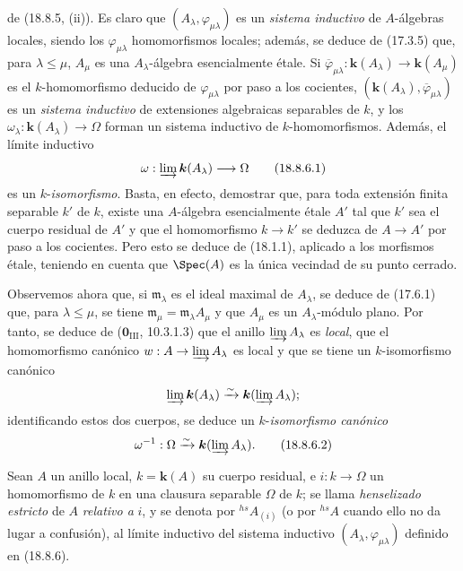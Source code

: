 \begin{env}[18.8.6]
de (18.8.5, (ii)). Es claro que $(A_\lambda,\varphi_{\mu\lambda})$ es un \emph{sistema inductivo} de $A$-álgebras locales, siendo los $\varphi_{\mu\lambda}$ homomorfismos locales; además, se deduce de (17.3.5) que, para $\lambda\leq\mu$, $A_\mu$ es una $A_\lambda$-álgebra esencialmente étale. Si $\overline\varphi_{\mu\lambda}:\boldsymbol{k}(A_\lambda)\to\boldsymbol{k}(A_\mu)$ es el $k$-homomorfismo deducido de $\varphi_{\mu\lambda}$ por paso a los cocientes, $(\boldsymbol{k}(A_\lambda),\overline\varphi_{\mu\lambda})$ es un \emph{sistema inductivo} de extensiones algebraicas separables de $k$, y los $\omega_\lambda:\boldsymbol{k}(A_\lambda)\to\Omega$ forman un sistema inductivo de $k$-homomorfismos. Además, el límite inductivo
\begin{equation}
  \omega:\varinjlim\boldsymbol{k}(A_\lambda)\longrightarrow\Omega
  \label{IV.18.8.6.1}
  \tag{18.8.6.1}
\end{equation}
es un $k$-\emph{isomorfismo}. Basta, en efecto, demostrar que, para toda extensión finita separable $k'$ de $k$, existe una $A$-álgebra esencialmente étale $A'$ tal que $k'$ sea el cuerpo residual de $A'$ y que el homomorfismo $k\to k'$ se deduzca de $A\to A'$ por paso a los cocientes. Pero esto se deduce de (18.1.1), aplicado a los morfismos étale, teniendo en cuenta que $\Spec(A)$ es la única vecindad de su punto cerrado.

Observemos ahora que, si $\mathfrak m_\lambda$ es el ideal maximal de $A_\lambda$, se deduce de (17.6.1) que, para $\lambda\leq\mu$, se tiene $\mathfrak m_\mu=\mathfrak m_\lambda A_\mu$ y que $A_\mu$ es un $A_\lambda$-módulo plano. Por tanto, se deduce de ($\mathbf{0}_{\mathrm{III}}$, 10.3.1.3) que el anillo $\varinjlim A_\lambda$ es \emph{local}, que el homomorfismo canónico $w:A\to\varinjlim A_\lambda$ es local y que se tiene un $k$-isomorfismo canónico
\[
  \varinjlim\boldsymbol{k}(A_\lambda)\xrightarrow{\sim}\boldsymbol{k}(\varinjlim A_\lambda);
\]
identificando estos dos cuerpos, se deduce un $k$-\emph{isomorfismo canónico}
\begin{equation}
  \omega^{-1}:\Omega\xrightarrow{\sim}\boldsymbol{k}(\varinjlim A_\lambda).
  \label{IV.18.8.6.2}
  \tag{18.8.6.2}
\end{equation}
\end{env}

\begin{definition}[18.8.7]
\label{IV.18.8.7}
Sean $A$ un anillo local, $k=\boldsymbol{k}(A)$ su cuerpo residual, e $i:k\to\Omega$ un homomorfismo de $k$ en una clausura separable $\Omega$ de $k$; se llama \emph{henselizado estricto} de $A$ \emph{relativo a} $i$, y se denota por ${}^{hs}\!A_{(i)}$ (o por ${}^{hs}\!A$ cuando ello no da lugar a confusión), al límite inductivo del sistema inductivo $(A_\lambda,\varphi_{\mu\lambda})$ definido en \textup{(18.8.6)}.
\end{definition}

